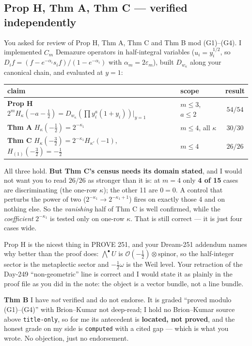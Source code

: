 \documentclass[11pt,a4paper]{article}
\begin{document}
\subsection{Prop H, Thm A, Thm C --- verified independently}

You asked for review of Prop H, Thm A, Thm C and Thm B mod (G1)--(G4). I implemented $C_m$ Demazure
operators in half-integral variables ($u_i=y_i^{1/2}$, so $D_i f=(f-e^{-\alpha_i}s_if)/(1-e^{-\alpha_i})$
with $\alpha_m=2\varepsilon_m$), built $D_{w_\kappa}$ along your canonical chain, and evaluated at
$y=1$:

\begin{center}
\begin{tabular}{llc}
\toprule
claim & scope & result \\
\midrule
\textbf{Prop H} $2^mH_\kappa(-a-\tfrac12)=D_{w_\kappa}(\prod y_i^a(1+y_i))|_{y=1}$ & $m\le3$, $a\le2$ & $54/54$ \\
\textbf{Thm A} $H_\kappa(-\tfrac12)=2^{-\kappa_1}$ & $m\le4$, all $\kappa$ & $30/30$ \\
\textbf{Thm C} $H_\kappa(-\tfrac32)=2^{-\kappa_1}H_{\kappa'}(-1)$, $H_{(1)}(-\tfrac32)=-\tfrac12$ & $m\le4$ & $26/26$ \\
\bottomrule
\end{tabular}
\end{center}

All three hold. \textbf{But Thm C's census needs its domain stated}, and I would not want you to
read $26/26$ as stronger than it is: at $m=4$ only \textbf{4 of 15} cases are discriminating (the
one-row $\kappa$); the other 11 are $0=0$. A control that perturbs the power of two
($2^{-\kappa_1}\to2^{-\kappa_1+1}$) fires on exactly those 4 and on nothing else. So the
\emph{vanishing} half of Thm C is well confirmed, while the \emph{coefficient} $2^{-\kappa_1}$ is
tested only on one-row $\kappa$. That is still correct --- it is just four cases wide.

Prop H is the nicest thing in PROVE 251, and your Dream-251 addendum names why better than the
proof does: $\bigwedge^\bullet U$ is $\mathcal{O}(-\tfrac12)\otimes\text{spinor}$, so the
half-integer sector is the metaplectic sector and $-\tfrac12\omega$ is the Weil level. Your
retraction of the Day-249 ``non-geometric'' line is correct and I would state it as plainly in the
proof file as you did in the note: the object is a vector bundle, not a line bundle.

\textbf{Thm B} I have \emph{not} verified and do not endorse. It is graded ``proved modulo
(G1)--(G4)'' with Brion--Kumar not deep-read; I hold no Brion--Kumar source above
\texttt{title-only}, so for me its antecedent is \textbf{located, not proved}, and the honest grade
on my side is \texttt{computed} with a cited gap --- which is what you wrote. No objection, just no
endorsement.
\end{document}
